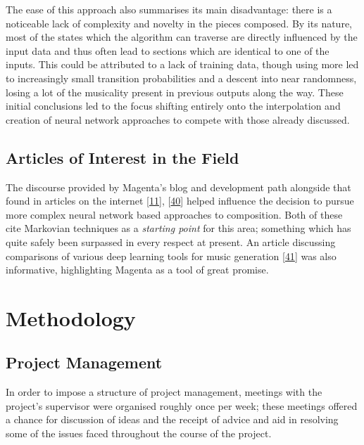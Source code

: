 \documentclass[12pt,]{article}
\begin{document}
The ease of this approach also summarises its main disadvantage: there
is a noticeable lack of complexity and novelty in the pieces composed.
By its nature, most of the states which the algorithm can traverse are
directly influenced by the input data and thus often lead to sections
which are identical to one of the inputs. This could be attributed to a
lack of training data, though using more led to increasingly small
transition probabilities and a descent into near randomness, losing a
lot of the musicality present in previous outputs along the way. These
initial conclusions led to the focus shifting entirely onto the
interpolation and creation of neural network approaches to compete with
those already discussed.

\hypertarget{articles-of-interest-in-the-field}{%
\subsection{Articles of Interest in the
Field}\label{articles-of-interest-in-the-field}}

The discourse provided by Magenta's blog and development path alongside
that found in articles on the internet
{[}\protect\hyperlink{ref-mediumkylemcdonald}{11}{]},
{[}\protect\hyperlink{ref-mkofler}{40}{]} helped influence the decision
to pursue more complex neural network based approaches to composition.
Both of these cite Markovian techniques as a \emph{starting point} for
this area; something which has quite safely been surpassed in every
respect at present. An article discussing comparisons of various deep
learning tools for music generation
{[}\protect\hyperlink{ref-asimovinst}{41}{]} was also informative,
highlighting Magenta as a tool of great promise.

\hypertarget{methodology}{%
\section{Methodology}\label{methodology}}

\hypertarget{project-management}{%
\subsection{Project Management}\label{project-management}}

In order to impose a structure of project management, meetings with the
project's supervisor were organised roughly once per week; these
meetings offered a chance for discussion of ideas and the receipt of
advice and aid in resolving some of the issues faced throughout the
course of the project.
\end{document}

